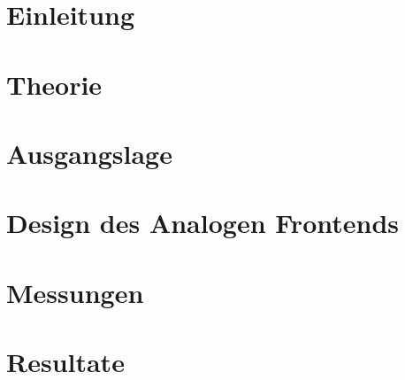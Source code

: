 \documentclass{fhnwreport} %
\begin{document}
\section{Einleitung}
\label{sec:motivation}
\label{sec:einleitung}


\clearpage

\section{Theorie}
\label{sec:sdr}


\clearpage

\section{Ausgangslage}
\label{sec:ausgangslage}


\clearpage

\section{Design des Analogen Frontends}
\label{sec:afe}


\clearpage

\section{Messungen}
\label{sec:messungen}


\clearpage

\section{Resultate}
\label{sec:resultate}

\end{document}
